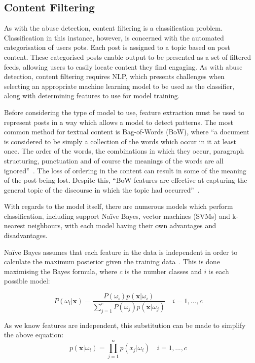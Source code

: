 \subsection{Content Filtering}
As with the abuse detection, content filtering is a classification problem. Classification in this instance, however, is concerned with the automated categorisation of users pots. Each post is assigned to a topic based on post content. These categorised posts enable output to be presented as a set of filtered feeds, allowing users to easily locate content they find engaging. As with abuse detection, content filtering requires NLP, which presents challenges when selecting an appropriate machine learning model to be used as the classifier, along with determining features to use for model training.

Before considering the type of model to use, feature extraction must be used to represent posts in a way which allows a model to detect patterns. The most common method for textual content is Bag-of-Words (BoW), where ``a document is considered to be simply a collection of the words which occur in it at least once. The order of the words, the combinations in which they occur, paragraph structuring, punctuation and of course the meanings of the words are all ignored''~\cite{Bramer:BoW}. The loss of ordering in the content can result in some of the meaning of the post being lost. Despite this, ``BoW features are effective at capturing the general topic of the discourse in which the topic had occurred''~\cite{Jurafsky:BoW}.

With regards to the model itself, there are numerous models which perform classification, including support Na\"ive Bayes, vector machines (SVMs) and k-nearest neighbours, with each model having their own advantages and disadvantages.

Na\"ive Bayes assumes that each feature in the data is independent in order to calculate the maximum posterior given the training data~\cite{Kuncheva:Bayes}. This is done maximising the Bayes formula, where $c$ is the number classes and $i$ is each possible model:

\begin{equation}
\label{eq:bayes}
P(\omega_{i}|\mathbf{x}) = \frac{P(\omega_{i})p(\mathbf{x}|\omega_{i})}{\sum_{j=1}^{c}P(\omega_{j})p(\mathbf{x}|\omega_{j})}\quad i=1,...,c
\end{equation}

\noindent As we know features are independent, this substitution can be made to simplify the above equation:  
\begin{equation}
\label{eq:bayes-simple}
p(\mathbf{x}|\omega_{i})=\prod_{j=1}^{n}p(x_{j}|\omega_{i})\quad i=1,...,c
\end{equation}

